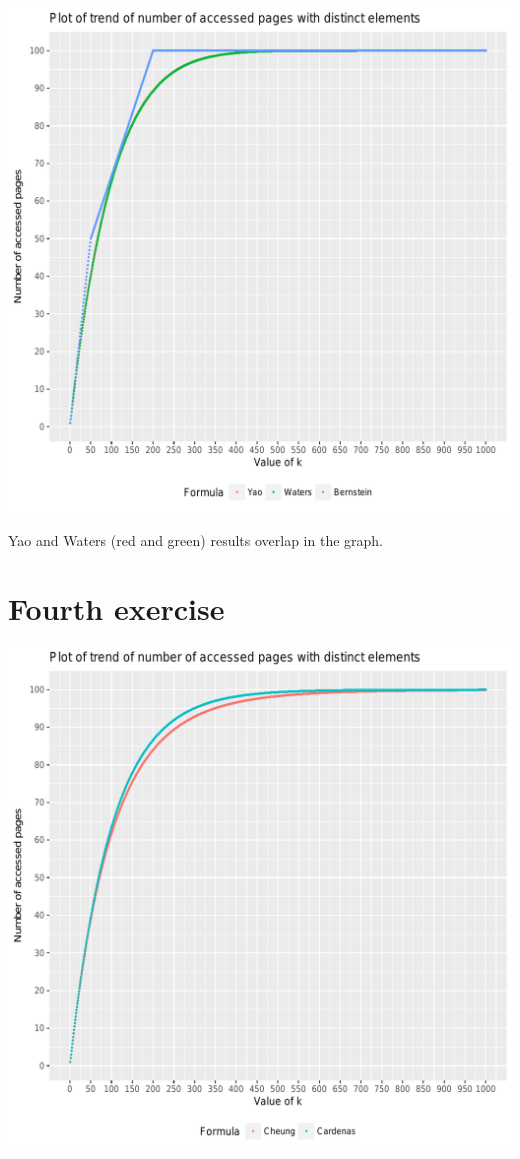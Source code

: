 \documentclass[12pt]{article}
\begin{document}
    \begin{center}
    \includegraphics[width=\textwidth]{yao_bernstein_waters.png}
    \end{center}
    
    Yao and Waters (red and green) results overlap in the graph.
    
    \section{Fourth exercise}
    
    \begin{center}
    \includegraphics[width=\textwidth]{cheung_cardenas.png}
    \end{center}
    
\end{document}
